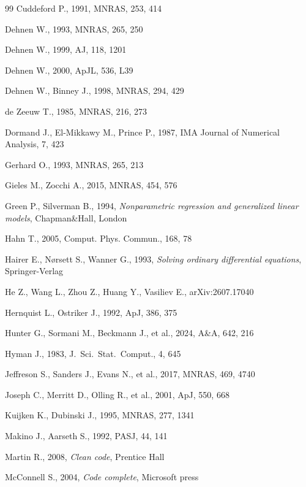 \documentclass[12pt]{article}
\begin{document}
\begin{thebibliography}{99}
Cuddeford P., 1991, MNRAS, 253, 414

Dehnen W., 1993, MNRAS, 265, 250

Dehnen W., 1999, AJ, 118, 1201

Dehnen W., 2000, ApJL, 536, L39

Dehnen W., Binney J., 1998, MNRAS, 294, 429

de Zeeuw T., 1985, MNRAS, 216, 273

Dormand J., El-Mikkawy M., Prince P., 1987, IMA Journal of Numerical Analysis, 7, 423

Gerhard O., 1993, MNRAS, 265, 213

Gieles M., Zocchi A., 2015, MNRAS, 454, 576

Green P., Silverman B., 1994, \textsl{Nonparametric regression and generalized linear models}, Chapman\&Hall, London

Hahn T., 2005, Comput. Phys. Commun., 168, 78

Hairer E., N{\o}rsett S., Wanner G., 1993, \textsl{Solving ordinary differential equations}, Springer-Verlag

He Z., Wang L., Zhou Z., Huang Y., Vasiliev E., arXiv:2607.17040

Hernquist L., Ostriker J., 1992, ApJ, 386, 375

Hunter G., Sormani M., Beckmann J., et al., 2024, A\&A, 642, 216

Hyman J., 1983, J.~Sci.~Stat.~Comput., 4, 645

Jeffreson S., Sanders J., Evans N., et al., 2017, MNRAS, 469, 4740

Joseph C., Merritt D., Olling R., et al., 2001, ApJ, 550, 668

Kuijken K., Dubinski J., 1995, MNRAS, 277, 1341

Makino J., Aarseth S., 1992, PASJ, 44, 141

Martin R., 2008, \textsl{Clean code}, Prentice Hall

McConnell S., 2004, \textsl{Code complete}, Microsoft press


\end{thebibliography}
\end{document}
